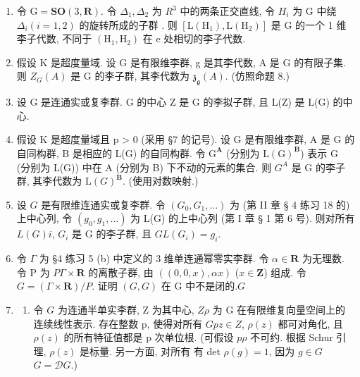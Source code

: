 
\begin{enumerate}
\def\labelenumi{\arabic{enumi}.}
\item
  令 \(\mathrm{G} = \mathbf{SO}(3, \mathbf{R})\). 令 \(\Delta_{1}, \Delta_{2}\) 为 \(R^{3}\) 中的两条正交直线, 令 \(H_{i}\) 为 G 中绕 \(\Delta_{i} (i = 1, 2)\) 的旋转所成的子群 . 则 \([\mathrm{L}(\mathrm{H}_{1}), \mathrm{L}(\mathrm{H}_{2})]\) 是 G 的一个 1 维李子代数, 不同于 \((\mathrm{H}_{1}, \mathrm{H}_{2})\) 在 e 处相切的李子代数.
\item
  假设 K 是超度量域. 设 G 是有限维李群, g 是其李代数, A 是 G 的有限子集. 则 \(Z_{G}(A)\) 是 G 的李子群, 其李代数为 \(\mathfrak{z}_{\mathfrak{g}}(A)\). (仿照命题 8.)
\item
  设 G 是连通实或复李群. G 的中心 Z 是 G 的李拟子群, 且 L(Z) 是 L(G) 的中心.
\item
  假设 K 是超度量域且 p \textgreater{} 0 (采用 §7 的记号). 设 G 是有限维李群, A 是 G 的自同构群, B 是相应的 L(G) 的自同构群. 令 \(\mathrm{G}^{\mathbf{A}}\) (分别为 \(\mathrm{L}(\mathrm{G})^{\mathbf{B}}\)) 表示 G (分别为 L(G)) 中在 A (分别为 B) 下不动的元素的集合. 则 \(G^{A}\) 是 G 的李子群, 其李代数为 \(\mathrm{L}(G)^{\mathbf{B}}\). (使用对数映射.)
\item
  设 \(G\) 是有限维连通实或复李群. 令 \((G_0, G_1, \ldots)\) 为 (第 II 章 § 4 练习 18 的) 上中心列, 令 \((g_0, g_1, \ldots)\) 为 L(G) 的上中心列 (第 I 章 § 1 第 6 号). 则对所有 \(L(G)\)\(i\), \(G_i\) 是 G 的李子群, 且 \(G\)\(L(G_i) = g_i\).
\item
  令 \(\Gamma\) 为 §4 练习 5 (b) 中定义的 3 维单连通幂零实李群. 令 \(\alpha \in \mathbf{R}\) 为无理数. 令 P 为 \(P\)\(\Gamma \times \mathbf{R}\) 的离散子群, 由 \(((0,0,x),\alpha x)\) (\(x \in \mathbf{Z}\)) 组成. 令 \(G = (\Gamma \times \mathbf{R}) / P\). 证明 \((G,G)\) 在 G 中不是闭的.\(G\)
\item
  \begin{enumerate}
  \def\labelenumii{(\alph{enumii})}
  \tightlist
  \item
    令 \(G\) 为连通半单实李群, Z 为其中心, \(Z\)\(\rho\) 为 G 在有限维复向量空间上的连续线性表示. 存在整数 p, 使得对所有 \(G\)\(p\)\(z \in Z\), \(\rho(z)\) 都可对角化, 且 \(\rho(z)\) 的所有特征值都是 p 次单位根. (可假设 \(p\)\(\rho\) 不可约. 根据 Schur 引理, \(\rho(z)\) 是标量. 另一方面, 对所有  有 det \(\rho(g) = 1\), 因为 \(g \in G\)\(G = \mathcal{D}G\).)
  \end{enumerate}
\end{enumerate}

